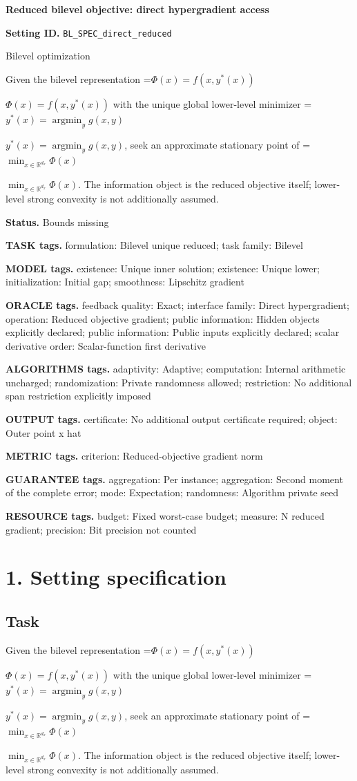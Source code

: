 \documentclass[10pt,a4paper]{article}
\newcommand{\AtlasMath}[1]{\par\begingroup\centering\setbox0=\hbox{$\displaystyle #1$}\ifdim\wd0>1.4\linewidth\typeout{ATLAS WIDE FORMULA: \the\wd0}\fi\ifdim\wd0>\linewidth\resizebox{\linewidth}{!}{\box0}\else\box0\fi\par\endgroup}
\newcommand{\AtlasInlineMath}[1]{\begingroup\setbox0=\hbox{$#1$}\ifdim\wd0>.4\linewidth\endgroup\AtlasMath{#1}\else\endgroup$#1$\fi}
\begin{document}
\raggedright

{\LARGE\bfseries\sffamily\color{AtlasNavy} Reduced bilevel objective: direct hypergradient access\par}\vspace{5pt}
\textbf{Setting ID.} \texttt{BL\_\allowbreak{}SPEC\_\allowbreak{}direct\_\allowbreak{}reduced}

Bilevel optimization

Given the bilevel representation \AtlasInlineMath{\Phi(x)=f(x,y^*(x))} with the unique global lower-level minimizer \AtlasInlineMath{y^*(x)=\operatorname*{argmin}_yg(x,y)}, seek an approximate stationary point of \AtlasInlineMath{\min_{x\in\mathbb{R}^{d_x}}\Phi(x)}. The information object is the reduced objective itself; lower-level strong convexity is not additionally assumed.

\textbf{Status.} Bounds missing

\textbf{TASK tags.} formulation: Bilevel unique reduced; task family: Bilevel

\textbf{MODEL tags.} existence: Unique inner solution; existence: Unique lower; initialization: Initial gap; smoothness: Lipschitz gradient

\textbf{ORACLE tags.} feedback quality: Exact; interface family: Direct hypergradient; operation: Reduced objective gradient; public information: Hidden objects explicitly declared; public information: Public inputs explicitly declared; scalar derivative order: Scalar-function first derivative

\textbf{ALGORITHMS tags.} adaptivity: Adaptive; computation: Internal arithmetic uncharged; randomization: Private randomness allowed; restriction: No additional span restriction explicitly imposed

\textbf{OUTPUT tags.} certificate: No additional output certificate required; object: Outer point x hat

\textbf{METRIC tags.} criterion: Reduced-objective gradient norm

\textbf{GUARANTEE tags.} aggregation: Per instance; aggregation: Second moment of the complete error; mode: Expectation; randomness: Algorithm private seed

\textbf{RESOURCE tags.} budget: Fixed worst-case budget; measure: N reduced gradient; precision: Bit precision not counted

\section{1. Setting specification}
\subsection{Task}
Given the bilevel representation \AtlasInlineMath{\Phi(x)=f(x,y^*(x))} with the unique global lower-level minimizer \AtlasInlineMath{y^*(x)=\operatorname*{argmin}_yg(x,y)}, seek an approximate stationary point of \AtlasInlineMath{\min_{x\in\mathbb{R}^{d_x}}\Phi(x)}. The information object is the reduced objective itself; lower-level strong convexity is not additionally assumed.
\end{document}

